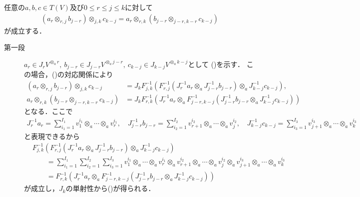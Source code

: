 	\begin{screen}
		\begin{lem}\label{lem:associative_law}
			任意の$a,b,c \in T(V)$及び$0 \leq r \leq j \leq k$に対して
			\begin{align}
				\left( a_r \otimes_{r,j} b_{j-r} \right) \otimes_{j,k} c_{k-j}
				= a_r \otimes_{r,k} \left( b_{j-r} \otimes_{j-r,k-r} c_{k-j} \right)
				\label{eq:thm_otimes_is_a_multiplication_1}
			\end{align}
			が成立する．
		\end{lem}
	\end{screen}
	
	\begin{prf}\mbox{}
		\begin{description}
			\item[第一段]
				$a_r \in J_r V^{\otimes_a r},\ b_{j-r} \in J_{j-r} V^{\otimes_a j-r},
				\ c_{k-j} \in J_{k-j} V^{\otimes_a k-j}$として
				()を示す．
				この場合，()の対応関係により
				\begin{align}
					\left( a_r \otimes_{r,j} b_{j-r} \right) \otimes_{j,k} c_{k-j}
					&= J_k F_{j,k}^{-1}\left( F_{r,j}^{-1} \left( J_r^{-1}a_r \otimes_a J_{j-r}^{-1} b_{j-r} \right) \otimes_a J_{k-j}^{-1} c_{k-j} \right), \\
					a_r \otimes_{r,k} \left( b_{j-r} \otimes_{j-r,k-r} c_{k-j} \right)
					&= J_k F_{r,k}^{-1}\left( J_r^{-1}a_r \otimes_a F_{j-r,k-j}^{-1} \left( J_{j-r}^{-1} b_{j-r} \otimes_a J_{k-j}^{-1} c_{k-j} \right) \right)
				\end{align}
				となる．ここで
				\begin{align}
					J_r^{-1} a_r = \sum_{i_1 = 1}^{I_1} v_1^{i_1} \otimes_a \cdots \otimes_a v_r^{i_1},
					\quad J_{j-r}^{-1} b_{j-r} = \sum_{i_2 = 1}^{I_2} v_{r+1}^{i_2} \otimes_a \cdots \otimes_a v_j^{i_2},
					\quad J_{k-j}^{-1} c_{k-j} = \sum_{i_3 = 1}^{I_3} v_{j+1}^{i_3} \otimes_a \cdots \otimes_a v_k^{i_3}
				\end{align}
				と表現できるから
				\begin{align}
					&F_{j,k}^{-1}\left( F_{r,j}^{-1} \left( J_r^{-1}a_r \otimes_a J_{j-r}^{-1} b_{j-r} \right) \otimes_a J_{k-j}^{-1} c_{k-j} \right) \\
					&\qquad = \sum_{i_1=1}^{I_1}\sum_{i_2=1}^{I_2}\sum_{i_3=1}^{I_3} 
						v_1^{i_1} \otimes_a \cdots \otimes_a v_r^{i_1}
						\otimes_a v_{r+1}^{i_2} \otimes_a \cdots \otimes_a v_j^{i_2}
						\otimes_a v_{j+1}^{i_3} \otimes_a \cdots \otimes_a v_k^{i_3} \\
					&\qquad = 	F_{r,k}^{-1}\left( J_r^{-1}a_r \otimes_a F_{j-r,k-j}^{-1} \left( J_{j-r}^{-1} b_{j-r} \otimes_a J_{k-j}^{-1} c_{k-j} \right) \right)
				\end{align}
				が成立し，$J_k$の単射性から()が得られる．
			

\end{description}
\end{prf}
